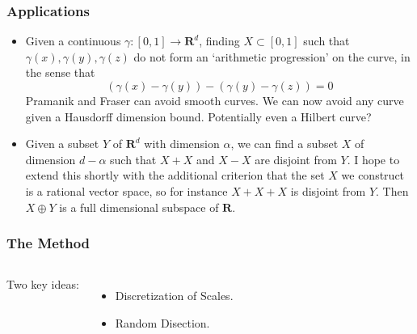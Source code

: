 \documentclass{beamer}
\begin{document}
\begin{frame}
    \frametitle{Applications}

    \begin{itemize}
        \item Given a continuous $\gamma: [0,1] \to \mathbf{R}^d$, finding $X \subset [0,1]$ such that $\gamma(x), \gamma(y), \gamma(z)$ do not form an `arithmetic progression' on the curve, in the sense that
        \[ (\gamma(x) - \gamma(y)) - (\gamma(y) - \gamma(z)) = 0 \]
        Pramanik and Fraser can avoid smooth curves. We can now avoid any curve given a Hausdorff dimension bound. Potentially even a Hilbert curve?
        \pause

        \item Given a subset $Y$ of $\mathbf{R}^d$ with dimension $\alpha$, we can find a subset $X$ of dimension $d - \alpha$ such that $X + X$ and $X - X$ are disjoint from $Y$. I hope to extend this shortly with the additional criterion that the set $X$ we construct is a rational vector space, so for instance $X + X + X$ is disjoint from $Y$. Then $X \oplus Y$ is a full dimensional subspace of $\mathbf{R}$.
    \end{itemize}
\end{frame}

\begin{frame}
    \frametitle{The Method}

    \begin{columns}


    {\Huge Two key ideas: }
    \pause

     \begin{itemize}
        \item {\Large Discretization of Scales.}
        \pause

        \item {\Large Random Disection.}
     \end{itemize}

     \end{columns}
\end{frame}
\end{document}
